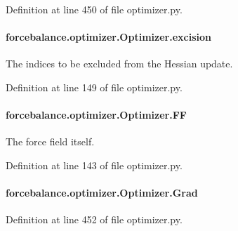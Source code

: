 Definition at line 450 of file optimizer.\-py.

\hypertarget{classforcebalance_1_1optimizer_1_1Optimizer_a1040c03a6361d782db8bd6a273d445e5}{
\paragraph[{excision}]{\setlength{\rightskip}{0pt plus 5cm}forcebalance.\-optimizer.\-Optimizer.\-excision}}\label{classforcebalance_1_1optimizer_1_1Optimizer_a1040c03a6361d782db8bd6a273d445e5}


The indices to be excluded from the Hessian update. 



Definition at line 149 of file optimizer.\-py.

\hypertarget{classforcebalance_1_1optimizer_1_1Optimizer_a873d6c3dfc5351d162613b596850af75}{
\paragraph[{F\-F}]{\setlength{\rightskip}{0pt plus 5cm}forcebalance.\-optimizer.\-Optimizer.\-F\-F}}\label{classforcebalance_1_1optimizer_1_1Optimizer_a873d6c3dfc5351d162613b596850af75}


The force field itself. 



Definition at line 143 of file optimizer.\-py.

\hypertarget{classforcebalance_1_1optimizer_1_1Optimizer_a91fbca8385133fa434eae3078e217fb6}{
\paragraph[{Grad}]{\setlength{\rightskip}{0pt plus 5cm}forcebalance.\-optimizer.\-Optimizer.\-Grad}}\label{classforcebalance_1_1optimizer_1_1Optimizer_a91fbca8385133fa434eae3078e217fb6}


Definition at line 452 of file optimizer.\-py.

